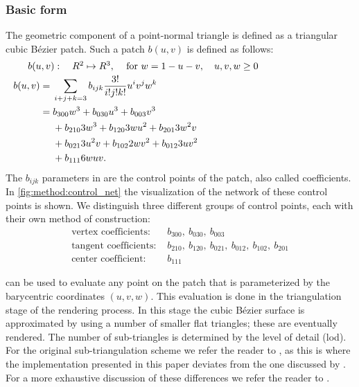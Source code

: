 \subsubsection{Basic form}
\label{sss:method:geometry:basicForm}
	The geometric component of a point-normal triangle is defined as a triangular cubic Bézier patch. Such a patch $b(u,v)$ is defined as follows:
	\begin{align}
	\noalign{$b(u,v): \quad R^2 \mapsto R^3,\quad$ for $w = 1 - u - v, \quad u, v, w \geq 0$}
	\begin{split}\label{eq:method:cubic_bezier_patch}
	    b(u,v) ={}& \sum_{i + j + k = 3} b_{ijk}\frac{3!}{i!j!k!} u^i v^j w^k\\
	      	   ={}& b_{300}w^3 + b_{030}u^3 + b_{003}v^3\\
	      	    {}& + b_{210}3w^3 + b_{120}3wu^2 + b_{201}3w^2v\\
	      	    {}& + b_{021}3u^2v + b_{102}2wv^2 + b_{012}3uv^2\\
	      	    {}& + b_{111}6wuv.
	\end{split}
	\end{align}
	The $b_{ijk}$ parameters in  are the control points of the patch, also called coefficients. In \cref{fig:method:control_net} the visualization of the network of these control points is shown. We distinguish three different groups of control points, each with their own method of construction: 
	\begin{align*}
		\text{vertex coefficients: } {}&  b_{300},\ b_{030},\ b_{003} \\
		\text{tangent coefficients: } {}&  b_{210},\ b_{120},\ b_{021},\ b_{012},\ b_{102},\ b_{201}\\
		\text{center coefficient: }   {}&  b_{111}
	\end{align*}

	 can be used to evaluate any point on the patch that is parameterized by the barycentric coordinates $(u,v,w)$. This evaluation is done in the triangulation stage of the rendering process. In this stage the cubic Bézier surface is approximated by using a number of smaller flat triangles; these are eventually rendered. The number of sub-triangles is determined by the level of detail (lod). For the original sub-triangulation scheme we refer the reader to \textcite{vlachos2001curved}, as this is where the implementation presented in this paper deviates from the one discussed by \citeauthor{vlachos2001curved}. For a more exhaustive discussion of these differences we refer the reader to .

